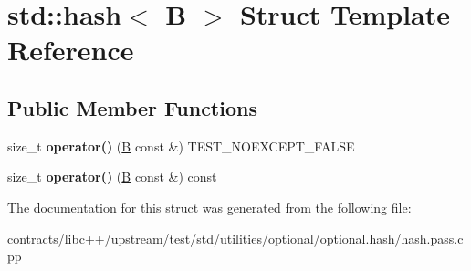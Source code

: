 \hypertarget{structstd_1_1hash_3_01_b_01_4}{}\section{std\+:\+:hash$<$ B $>$ Struct Template Reference}
\label{structstd_1_1hash_3_01_b_01_4}
\subsection*{Public Member Functions}
\begin{DoxyCompactItemize}
\item 
\mbox{\label{structstd_1_1hash_3_01_b_01_4_a58d4da7580f222bc5b2ccb8e06fb31bd}} 
size\+\_\+t {\bfseries operator()} (\mbox{\hyperlink{struct_b}{B}} const \&) T\+E\+S\+T\+\_\+\+N\+O\+E\+X\+C\+E\+P\+T\+\_\+\+F\+A\+L\+SE
\item 
\mbox{\label{structstd_1_1hash_3_01_b_01_4_a79c4874836ab58049a862511e3c273df}} 
size\+\_\+t {\bfseries operator()} (\mbox{\hyperlink{struct_b}{B}} const \&) const
\end{DoxyCompactItemize}


The documentation for this struct was generated from the following file\+:\begin{DoxyCompactItemize}
\item 
contracts/libc++/upstream/test/std/utilities/optional/optional.\+hash/hash.\+pass.\+cpp\end{DoxyCompactItemize}
